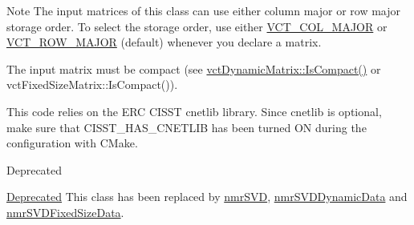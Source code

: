 \begin{DoxyNote}{Note}
The input matrices of this class can use either column major or row major storage order. To select the storage order, use either \hyperlink{vct_forward_declarations_8h_a432cdf8923afaf82f551450ad4034746}{V\-C\-T\-\_\-\-C\-O\-L\-\_\-\-M\-A\-J\-O\-R} or \hyperlink{vct_forward_declarations_8h_a45ba752f741240bf765417ebc8130d62}{V\-C\-T\-\_\-\-R\-O\-W\-\_\-\-M\-A\-J\-O\-R} (default) whenever you declare a matrix.

The input matrix must be compact (see \hyperlink{classvct_dynamic_const_matrix_base_ac061c634b765bbd24e2772375c4578a1}{vct\-Dynamic\-Matrix\-::\-Is\-Compact()} or vct\-Fixed\-Size\-Matrix\-::\-Is\-Compact()).

This code relies on the E\-R\-C C\-I\-S\-S\-T cnetlib library. Since cnetlib is optional, make sure that C\-I\-S\-S\-T\-\_\-\-H\-A\-S\-\_\-\-C\-N\-E\-T\-L\-I\-B has been turned O\-N during the configuration with C\-Make.
\end{DoxyNote}
\begin{DoxyRefDesc}{Deprecated}
\item[\hyperlink{deprecated__deprecated000003}{Deprecated}]This class has been replaced by \hyperlink{nmr_s_v_d_8h_a52115d0e7a485c4494aa20f4f3f4ebe7}{nmr\-S\-V\-D}, \hyperlink{classnmr_s_v_d_dynamic_data}{nmr\-S\-V\-D\-Dynamic\-Data} and \hyperlink{classnmr_s_v_d_fixed_size_data}{nmr\-S\-V\-D\-Fixed\-Size\-Data}. \end{DoxyRefDesc}


